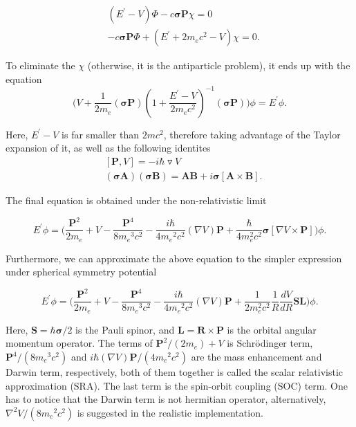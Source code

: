 \documentclass[a4paper, 12pt, titlepage,oneside,drop]{kthesis}
\begin{document}
\begin{equation}
\begin{split}
&(E^{\prime} - V) \Phi - c \boldsymbol{\sigma} \textbf{P} \chi = 0\\                
&-c\boldsymbol{\sigma} \textbf{P} \Phi + (E^{\prime}+2m_ec^2-V)\chi = 0.
\end{split}
\end{equation}

\noindent To eliminate the $\chi$ (otherwise, it is the antiparticle problem), it ends up with the equation
  \begin{equation}\label{soc1212}
\Big(V + \frac{1}{2m_e} (\boldsymbol{\sigma} \textbf{P}) (1+\frac{E^{\prime}-V}{2m_ec^2})^{-1} (\boldsymbol{\sigma} \textbf{P}) \Big)\phi=E^{\prime}\phi.
\end{equation}

\noindent Here, ${E^{\prime}-V}$ is far smaller than ${2mc^2}$, therefore taking advantage of the Taylor expansion of it,  as well as the following identites
\begin{equation}
\begin{split}
& [\textbf{P}, V ] = -i \hbar \triangledown V \\                
&(\boldsymbol{\sigma} \textbf{A} )(\boldsymbol{\sigma} \textbf{B}) = \textbf{A} \textbf{B} + i\boldsymbol{\sigma}[\textbf{A} \times \textbf{B}].
\end{split}
\end{equation}

The final equation is obtained under the non-relativistic limit

\begin{equation}\label{nonrela1}
E^{\prime} \phi = \Big(\frac{\textbf{P}^2}{2m_e} + V - \frac{\textbf{P}^4}{8 {m_e}^3 {c}^2}-\frac{i\hbar}{4{m_e}^2 {c}^2} (\nabla{V})\textbf{P}+\frac{\hbar}{4 m_e^2 c^2} \boldsymbol{\sigma}[\nabla{V} \times \textbf{P}]\Big) \phi.
\end{equation}

Furthermore, we can approximate the above equation to the simpler expression under spherical symmetry potential

\begin{equation}
 E^{\prime} \phi = \Big(\frac{\textbf{P}^2}{2m_e} +V - \frac{\textbf{P}^4}{8 {m_e}^3 {c}^2}-\frac{i\hbar}{4{m_e}^2 {c}^2} (\nabla{V})\textbf{P}+\frac{1}{2 m_e^2 c^2} \frac{1}{R} \frac{dV}{dR}\textbf{S}\textbf{L}\Big) \phi.
\end{equation}

\noindent Here, $\textbf{S} = {\hbar}{\boldsymbol{\sigma}}/2$ is the Pauli spinor, and $\textbf{L} = \textbf{R} \times \textbf{P}$ is the orbital
angular momentum operator. The terms of ${\textbf{P}^2}/(2m_e) + V$ is Schrödinger term,  ${\textbf{P}^4}/(8 {m_e}^3 {c}^2)$ and ${i\hbar} (\nabla{V})\textbf{P} /(4{m_e}^2 {c}^2)$  are the mass enhancement 
and Darwin term, respectively, both of them together is called the scalar relativistic approximation (SRA). The last term is the spin-orbit coupling (SOC) term. One has to
notice that the Darwin term is not hermitian operator, alternatively, $\nabla^2{V} /(8{m_e}^2 {c}^2)$ is suggested in the realistic implementation.
\end{document}
